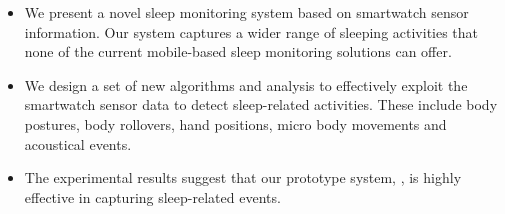 \begin{itemize}[itemsep=1mm,nolistsep]

\item We present a novel sleep monitoring system based on smartwatch sensor information. Our system captures a wider range of sleeping
    activities that none of the current mobile-based sleep monitoring solutions can offer.

\item We design a set of new algorithms and analysis to effectively exploit the smartwatch sensor data to detect sleep-related
    activities. These include body postures, body rollovers, hand positions, micro body movements and acoustical events.

\item The experimental results suggest that our prototype system, \systemname, is highly effective in capturing sleep-related events.

\end{itemize}



%
%


